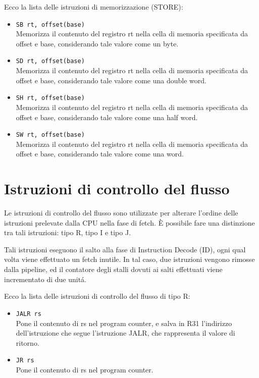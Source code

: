 \documentclass[12pt]{report}
\begin{document}
Ecco la lista delle istruzioni di memorizzazione (STORE):

\begin{itemize}
	\item \texttt{SB rt, offset(base)}\\
	Memorizza il contenuto del registro rt nella cella di memoria specificata da offset e base, 
	considerando tale valore come un byte.
	
	\item \texttt{SD rt, offset(base)}\\
	Memorizza il contenuto del registro rt nella cella di memoria specificata da offset e base, 
	considerando tale valore come una double word.

	\item \texttt{SH rt, offset(base)}\\
	Memorizza il contenuto del registro rt nella cella di memoria specificata da offset e base, 
	considerando tale valore come una half word.

	\item \texttt{SW rt, offset(base)}\\
	Memorizza il contenuto del registro rt nella cella di memoria specificata da offset e base, 
	considerando tale valore come una word.
\end{itemize}

\section{Istruzioni di controllo del flusso}
Le istruzioni di controllo del flusso sono utilizzate per alterare l'ordine delle istruzioni prelevate 
dalla CPU nella fase di fetch. \`{E} possibile fare una distinzione tra tali istruzioni: tipo R, tipo I e tipo J.

Tali istruzioni eseguono il salto alla fase di Instruction Decode (ID), ogni qual volta viene effettuato 
un fetch inutile. In tal caso, due istruzioni vengono rimosse dalla pipeline, ed il contatore degli stalli 
dovuti ai salti effettuati viene incrementato di due unit\'{a}.

Ecco la lista delle istruzioni di controllo del flusso di tipo R:
\begin{itemize}
	\item \texttt{JALR rs}\\
	Pone il contenuto di rs nel program counter, e salva in R31 l'indirizzo dell'istruzione che segue 
	l'istruzione JALR, che rappresenta il valore di ritorno.

	\item \texttt{JR rs}\\
	Pone il contenuto di rs nel program counter.
\end{itemize}
\end{document}
